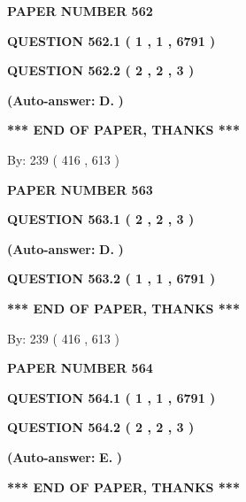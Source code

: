 \documentclass[12pt]{article}
\begin{document}
   
 {\textbf{ \Large{ PAPER NUMBER  562  }}}
   
   
   
   
  
  
{\textbf{\large{QUESTION
562.1 
 ( 1 , 1 , 6791 )
}}}
  
  
{\textbf{\large{QUESTION
562.2 
 ( 2 , 2 , 3 )
}}}
 
 
{\textbf{(Auto-answer:}}
{\textbf{\large{
D.}}}
{\textbf{)}}
 
 
   
   
   
   
\vspace{1.0in} 
{\textbf{\large{ *** END OF PAPER, THANKS *** }}} 
   
   
\hspace{1.0in} By: 
 239 ( 416 ,  613 )
   
   
   
   
\newpage 
\setcounter{page}{ 
   563001 } 
   
   
 {\textbf{ \Large{ PAPER NUMBER  563  }}}
   
   
   
   
  
  
{\textbf{\large{QUESTION
563.1 
 ( 2 , 2 , 3 )
}}}
 
 
{\textbf{(Auto-answer:}}
{\textbf{\large{
D.}}}
{\textbf{)}}
 
 
  
  
{\textbf{\large{QUESTION
563.2 
 ( 1 , 1 , 6791 )
}}}
   
   
   
   
\vspace{1.0in} 
{\textbf{\large{ *** END OF PAPER, THANKS *** }}} 
   
   
\hspace{1.0in} By: 
 239 ( 416 ,  613 )
   
   
   
   
\newpage 
\setcounter{page}{ 
   564001 } 
   
   
 {\textbf{ \Large{ PAPER NUMBER  564  }}}
   
   
   
   
  
  
{\textbf{\large{QUESTION
564.1 
 ( 1 , 1 , 6791 )
}}}
  
  
{\textbf{\large{QUESTION
564.2 
 ( 2 , 2 , 3 )
}}}
 
 
{\textbf{(Auto-answer:}}
{\textbf{\large{
E.}}}
{\textbf{)}}
 
 
   
   
   
   
\vspace{1.0in} 
{\textbf{\large{ *** END OF PAPER, THANKS *** }}} 
   
\end{document}
